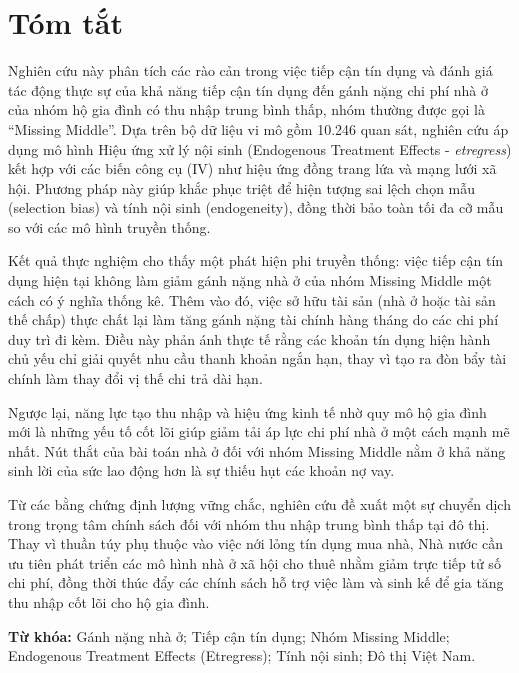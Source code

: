 \documentclass[12pt,a4paper]{report}
\begin{document}
	\chapter*{Tóm tắt}
	
	Nghiên cứu này phân tích các rào cản trong việc tiếp cận tín dụng và đánh giá tác động thực sự của khả năng tiếp cận tín dụng đến gánh nặng chi phí nhà ở của nhóm hộ gia đình có thu nhập trung bình thấp, nhóm thường được gọi là ``Missing Middle''. Dựa trên bộ dữ liệu vi mô gồm 10.246 quan sát, nghiên cứu áp dụng mô hình Hiệu ứng xử lý nội sinh (Endogenous Treatment Effects - \textit{etregress}) kết hợp với các biến công cụ (IV) như hiệu ứng đồng trang lứa và mạng lưới xã hội. Phương pháp này giúp khắc phục triệt để hiện tượng sai lệch chọn mẫu (selection bias) và tính nội sinh (endogeneity), đồng thời bảo toàn tối đa cỡ mẫu so với các mô hình truyền thống.
	
	Kết quả thực nghiệm cho thấy một phát hiện phi truyền thống: việc tiếp cận tín dụng hiện tại không làm giảm gánh nặng nhà ở của nhóm Missing Middle một cách có ý nghĩa thống kê. Thêm vào đó, việc sở hữu tài sản (nhà ở hoặc tài sản thế chấp) thực chất lại làm tăng gánh nặng tài chính hàng tháng do các chi phí duy trì đi kèm. Điều này phản ánh thực tế rằng các khoản tín dụng hiện hành chủ yếu chỉ giải quyết nhu cầu thanh khoản ngắn hạn, thay vì tạo ra đòn bẩy tài chính làm thay đổi vị thế chi trả dài hạn.
	
	Ngược lại, năng lực tạo thu nhập và hiệu ứng kinh tế nhờ quy mô hộ gia đình mới là những yếu tố cốt lõi giúp giảm tải áp lực chi phí nhà ở một cách mạnh mẽ nhất. Nút thắt của bài toán nhà ở đối với nhóm Missing Middle nằm ở khả năng sinh lời của sức lao động hơn là sự thiếu hụt các khoản nợ vay.
	
	Từ các bằng chứng định lượng vững chắc, nghiên cứu đề xuất một sự chuyển dịch trong trọng tâm chính sách đối với nhóm thu nhập trung bình thấp tại đô thị. Thay vì thuần túy phụ thuộc vào việc nới lỏng tín dụng mua nhà, Nhà nước cần ưu tiên phát triển các mô hình nhà ở xã hội cho thuê nhằm giảm trực tiếp tử số chi phí, đồng thời thúc đẩy các chính sách hỗ trợ việc làm và sinh kế để gia tăng thu nhập cốt lõi cho hộ gia đình.
	
	\vspace{1em}
	\noindent\textbf{Từ khóa:} Gánh nặng nhà ở; Tiếp cận tín dụng; Nhóm Missing Middle; Endogenous Treatment Effects (Etregress); Tính nội sinh; Đô thị Việt Nam.
		
\end{document}
